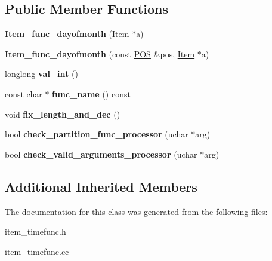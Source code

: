 \subsection*{Public Member Functions}
\begin{DoxyCompactItemize}
\item 
\mbox{\label{classItem__func__dayofmonth_a50fd06cc184bc60c5da619812e29dc59}} 
{\bfseries Item\+\_\+func\+\_\+dayofmonth} (\mbox{\hyperlink{classItem}{Item}} $\ast$a)
\item 
\mbox{\label{classItem__func__dayofmonth_ac6e0a749c6482f5d4e7ce0776677fa62}} 
{\bfseries Item\+\_\+func\+\_\+dayofmonth} (const \mbox{\hyperlink{structYYLTYPE}{P\+OS}} \&pos, \mbox{\hyperlink{classItem}{Item}} $\ast$a)
\item 
\mbox{\label{classItem__func__dayofmonth_aeb71c4714a95b20a565ef549ca584a54}} 
longlong {\bfseries val\+\_\+int} ()
\item 
\mbox{\label{classItem__func__dayofmonth_a3c4353ba2ef40a01f29f04a7fd9133a3}} 
const char $\ast$ {\bfseries func\+\_\+name} () const
\item 
\mbox{\label{classItem__func__dayofmonth_a3f371d3117245a7163c2529df0ba2cc2}} 
void {\bfseries fix\+\_\+length\+\_\+and\+\_\+dec} ()
\item 
\mbox{\label{classItem__func__dayofmonth_aaeb94e125bb6bd30c9968c8137c50760}} 
bool {\bfseries check\+\_\+partition\+\_\+func\+\_\+processor} (uchar $\ast$arg)
\item 
\mbox{\label{classItem__func__dayofmonth_a471e5790d3258b8b63a8e82bbce1c79b}} 
bool {\bfseries check\+\_\+valid\+\_\+arguments\+\_\+processor} (uchar $\ast$arg)
\end{DoxyCompactItemize}
\subsection*{Additional Inherited Members}


The documentation for this class was generated from the following files\+:\begin{DoxyCompactItemize}
\item 
item\+\_\+timefunc.\+h\item 
\mbox{\hyperlink{item__timefunc_8cc}{item\+\_\+timefunc.\+cc}}\end{DoxyCompactItemize}
